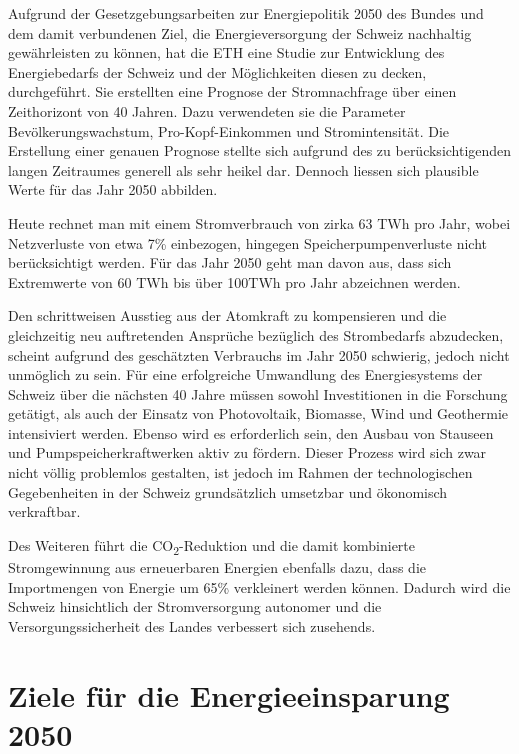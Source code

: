 Aufgrund der Gesetzgebungsarbeiten zur Energiepolitik 2050 des Bundes und dem damit verbundenen Ziel, die Energieversorgung der Schweiz nachhaltig gewährleisten zu können, hat die ETH eine Studie zur Entwicklung des Energiebedarfs der Schweiz und der Möglichkeiten diesen zu decken, durchgeführt. Sie erstellten eine Prognose der Stromnachfrage über einen Zeithorizont von 40 Jahren. Dazu verwendeten sie die Parameter Bevölkerungswachstum, Pro-Kopf-Einkommen und Stromintensität. Die Erstellung einer genauen Prognose stellte sich aufgrund des zu berücksichtigenden langen Zeitraumes generell als sehr heikel dar. Dennoch liessen sich plausible Werte für das Jahr 2050 abbilden.
\par
Heute rechnet man mit einem Stromverbrauch von zirka 63 TWh pro Jahr, wobei Netzverluste von etwa 7\% einbezogen, hingegen Speicherpumpenverluste nicht berücksichtigt werden. Für das Jahr 2050 geht man davon aus, dass sich Extremwerte von 60 TWh bis über 100TWh pro Jahr abzeichnen werden.
\par
Den schrittweisen Ausstieg aus der Atomkraft zu kompensieren und die gleichzeitig neu auftretenden Ansprüche bezüglich des Strombedarfs abzudecken, scheint aufgrund des geschätzten Verbrauchs im Jahr 2050 schwierig, jedoch nicht unmöglich zu sein. Für eine erfolgreiche Umwandlung des Energiesystems der Schweiz über die nächsten 40 Jahre müssen sowohl Investitionen in die Forschung getätigt, als auch der Einsatz von Photovoltaik, Biomasse, Wind und Geothermie intensiviert werden.
Ebenso wird es erforderlich sein, den Ausbau von Stauseen und Pumpspeicherkraftwerken aktiv zu fördern. Dieser Prozess wird sich zwar nicht völlig problemlos gestalten, ist jedoch im Rahmen der technologischen Gegebenheiten in der Schweiz grundsätzlich umsetzbar und ökonomisch verkraftbar.
\par
Des Weiteren führt die CO\textsubscript{2}-Reduktion und die damit kombinierte Stromgewinnung aus erneuerbaren Energien ebenfalls dazu, dass die Importmengen von Energie um 65\% verkleinert werden können. Dadurch wird die Schweiz hinsichtlich der Stromversorgung autonomer und die Versorgungssicherheit des Landes verbessert sich zusehends.
 

\section{Ziele für die Energieeinsparung 2050}

